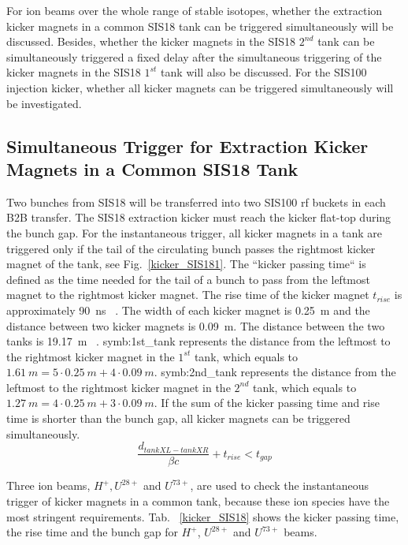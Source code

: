For ion beams over the whole range of stable isotopes, whether the extraction kicker magnets in a common SIS18 tank can be triggered simultaneously will be discussed. Besides, whether the kicker magnets in the SIS18 $2^{nd}$ tank can be simultaneously triggered a fixed delay after the simultaneous triggering of the kicker magnets in the SIS18 $1^{st}$ tank will also be discussed. For the SIS100 injection kicker, whether all kicker magnets can be triggered simultaneously will be investigated. 


\subsection{Simultaneous Trigger for Extraction Kicker Magnets in a Common SIS18 Tank}
Two bunches from SIS18 will be transferred into two SIS100 rf buckets in each B2B transfer. The SIS18 extraction kicker must reach the kicker flat-top during the bunch gap. For the instantaneous trigger, all kicker magnets in a tank are triggered only if the tail of the circulating bunch passes the rightmost kicker magnet of the tank, see Fig.~\ref{kicker_SIS181}. The ``kicker passing time`` is defined as the time needed for the tail of a bunch to pass from the leftmost magnet to the rightmost kicker magnet. The rise time of the kicker magnet $t_\mathit{rise}$ is approximately \SI{90}{ns} ~\cite{blell_f-ds-ie-03e_2014}. The width of each kicker magnet is \SI{0.25}{m} and the distance between two kicker magnets is \SI{0.09}{m}. The distance between the two tanks is \SI{19.17}{m} ~\cite{ros_sis18_2008}. \gls{symb:1st_tank} represents the distance from the leftmost to the rightmost kicker magnet in the $1^{st}$ tank, which equals to $\SI{1.61}{m}= 5 \cdot \SI{0.25}{m} + 4 \cdot \SI{0.09}{m}$. \gls{symb:2nd_tank} represents  the distance from the leftmost to the rightmost kicker magnet in the $2^{nd}$ tank, which equals to $\SI{1.27}{m}= 4 \cdot \SI{0.25}{m} + 3 \cdot \SI{0.09}{m}$. If the sum of the kicker passing time and rise time is shorter than the bunch gap, all kicker magnets can be triggered simultaneously. 
\begin{equation}
\label{simul_kicker}
		\frac{d_\mathit{tankXL-tankXR}}{\beta c}+t_\mathit{rise}<t_\mathit{gap}
\end{equation}

Three ion beams, $H^+, U^{28+}$ and $U^{73+}$, are used to check the instantaneous trigger of kicker magnets in a common tank, because these ion species have the most stringent requirements. Tab. ~\ref{kicker_SIS18} shows the kicker passing time, the rise time and the bunch gap for $H^+$, $U^{28+}$ and $U^{73+}$ beams. 

